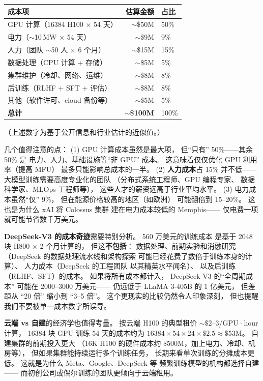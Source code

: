 \begin{center}
\small
\begin{tabular}{lrl}
\hline
\textbf{成本项} & \textbf{估算金额} & \textbf{占比} \\
\hline
GPU 计算（16384 H100 $\times$ 54 天） & $\sim$\$50M & 50\% \\
电力（$\sim$10\,MW $\times$ 54 天） & $\sim$\$9M & 9\% \\
人力（团队 $\sim$50 人 $\times$ 6 个月） & $\sim$\$15M & 15\% \\
数据处理（CPU 计算 + 存储） & $\sim$\$5M & 5\% \\
集群维护（冷却、网络、运维） & $\sim$\$8M & 8\% \\
后训练（RLHF + SFT + 评估） & $\sim$\$8M & 8\% \\
其他（软件许可、cloud 备份等） & $\sim$\$5M & 5\% \\
\hline
\textbf{总计} & $\sim$\textbf{\$100M} & 100\% \\
\hline
\end{tabular}
\end{center}

（上述数字为基于公开信息和行业估计的近似值。）

几个值得注意的点：
(1) GPU 计算成本虽然是最大项，
但``只有'' 50\%——其余 50\% 是
电力、人力、基础设施等``非 GPU'' 成本。
这意味着仅仅优化 GPU 利用率（提高 MFU）
最多只能影响总成本的一半。
(2) \textbf{人力成本}占 15\% 并不低——
大模型训练需要高度专业化的团队
（分布式系统工程师、GPU 编程专家、
数据科学家、MLOps 工程师等），
这些人才的薪资远高于行业平均水平。
(3) 电力成本虽然``仅'' 9\%，
但在能源价格较高的地区（如欧洲）
可能翻倍到 15--20\%。
这也是为什么 xAI 将 Colossus 集群
建在电力成本较低的 Memphis——
仅电费一项就可能节省数千万美元。

\textbf{DeepSeek-V3 的成本奇迹}需要特别分析。
560 万美元的训练成本
是基于 2048 块 H800 $\times$ 2 个月计算的，
但这\textbf{不包括}：
数据处理、前期实验和消融研究
（DeepSeek 的数据处理流水线和架构探索
可能已经花费了数倍于训练本身的计算）、
人力成本（DeepSeek 的工程团队
以其精英水平闻名）、
以及后训练（RLHF、SFT）的成本。
如果将所有成本都计入，
DeepSeek-V3 的``全周期成本''
可能在 2000--3000 万美元——
仍远低于 LLaMA 3-405B 的 1 亿美元，
但差距从 ``20 倍'' 缩小到 ``3--5 倍''。
这个更现实的比较仍然令人印象深刻，
但也提醒我们不要被单一成本数字所误导。

\textbf{云端 vs 自建}的经济学也值得考量。
按云端 H100 的典型租价 $\sim$$\$$2--3/GPU·hour 计算，
16384 块 GPU 训练 54 天的成本约为
$16384 \times 54 \times 24 \times \$2.5 \approx \$53$M。
自建集群的前期投入更大
（16K H100 的硬件成本约 $\$$500M，加上电力、冷却、机房等），
但如果集群能持续运行多个训练任务，
长期来看单次训练的分摊成本更低。
这就是为什么 Meta、Google、DeepSeek 等
频繁训练模型的机构都选择自建——
而初创公司或偶尔训练的团队更倾向于云端租用。

